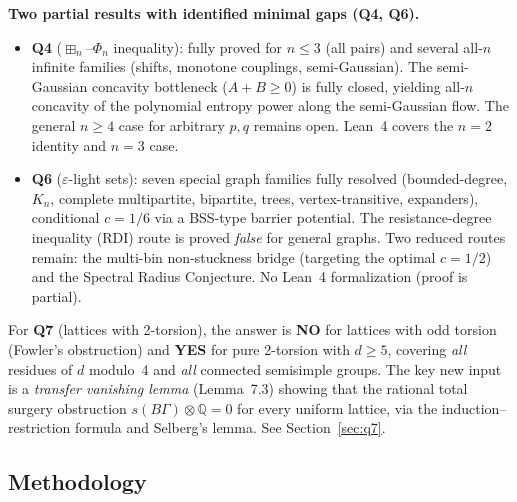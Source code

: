 \documentclass[11pt]{article}
\theoremstyle{definition}
\theoremstyle{remark}
\begin{document}
\medskip\noindent
\textbf{Two partial results with identified minimal gaps (Q4, Q6).}
\begin{itemize}[nosep]
\item \textbf{Q4} ($\boxplus_n$--$\Phi_n$ inequality):
  fully proved for $n\le 3$ (all pairs) and several all-$n$
  infinite families (shifts, monotone couplings, semi-Gaussian).
  The semi-Gaussian concavity bottleneck ($A+B\ge 0$) is fully
  closed, yielding all-$n$ concavity of the polynomial entropy power
  along the semi-Gaussian flow.
  The general $n\ge 4$ case for arbitrary $p,q$ remains open.
  Lean~4 covers the $n=2$ identity and $n=3$ case.
\item \textbf{Q6} ($\varepsilon$-light sets):
  seven special graph families fully resolved
  (bounded-degree, $K_n$, complete multipartite, bipartite,
  trees, vertex-transitive, expanders),
  conditional $c=1/6$ via a BSS-type barrier potential.
  The resistance-degree inequality (RDI) route is proved
  \emph{false} for general graphs.
  Two reduced routes remain: the multi-bin non-stuckness bridge
  (targeting the optimal $c=1/2$) and the Spectral Radius Conjecture.
  No Lean~4 formalization (proof is partial).
\end{itemize}

\noindent
For \textbf{Q7} (lattices with 2-torsion), the answer is \textbf{NO} for
lattices with odd torsion (Fowler's obstruction) and \textbf{YES} for
pure 2-torsion with $d\ge 5$, covering \emph{all} residues of $d$ modulo~4
and \emph{all} connected semisimple groups.  The key new input is a
\emph{transfer vanishing lemma} (Lemma~7.3) showing that the
rational total surgery obstruction $s(B\Gamma)\otimes\mathbb Q=0$
for every uniform lattice, via the induction--restriction formula and
Selberg's lemma.  See Section~\ref{sec:q7}.

\subsection{Methodology}
\end{document}
